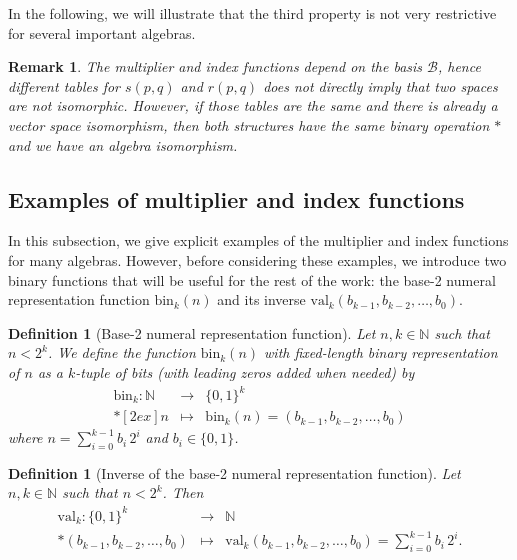 \documentclass{article}
\newtheorem{definition}[theorem]{Definition}
\newtheorem{remark}[theorem]{Remark}
\begin{document}
In the following, we will illustrate that the third property is not very restrictive for several important algebras.%

\begin{remark} 
    The multiplier and index functions depend on the basis $\mathcal B$, hence different tables for $s(p,q)$ and $r(p,q)$ does not directly imply that two spaces are not isomorphic. However, if those tables are the same and there is already a vector space isomorphism, then both structures have the same binary operation $*$ and we have an algebra isomorphism.
\end{remark}

\subsection{Examples of multiplier and index functions}
\label{subsection : some examples}
In this subsection, we give explicit examples of the multiplier and index functions for many algebras. However, before considering these examples, we introduce two binary functions that will be useful for the rest of the work: the base-2 numeral representation function $\mathrm{bin}_k(n)$ and its inverse $\mathrm{val}_k(b_{k-1},b_{k-2},\ldots,b_0).$

\begin{definition}[Base-2 numeral representation function]
Let $n,k\in \mathbb N$ such that $n< 2^k$. We define the function $\mathrm{bin}_k(n)$ with fixed-length binary representation of 
$n$ as a $k$-tuple of bits (with leading zeros added when needed) by
$$
\begin{array}{rcl}
\mathrm{bin}_k: \mathbb N & \rightarrow & \{0,1\}^k \\*[2ex]
n &\mapsto & \mathrm{bin}_k(n)=(b_{k-1},b_{k-2},\ldots,b_0)
\end{array}
$$
where $n=\sum_{i=0}^{k-1} b_i\,2^i$ and $b_i\in \{0,1\}$.
\end{definition}

\begin{definition}[Inverse of the base-2 numeral representation function]
Let $n,k\in \mathbb N$ such that $n< 2^k$. Then
$$
\begin{array}{rcl}
\mathrm{val}_k: \{0,1\}^k & \rightarrow & \mathbb N \\*
(b_{k-1},b_{k-2},\ldots,b_0) &\mapsto & \mathrm{val}_k(b_{k-1},b_{k-2},\ldots,b_0)=\displaystyle\sum_{i=0}^{k-1} b_i\,2^i.
\end{array}
$$
\end{definition}
\end{document}
